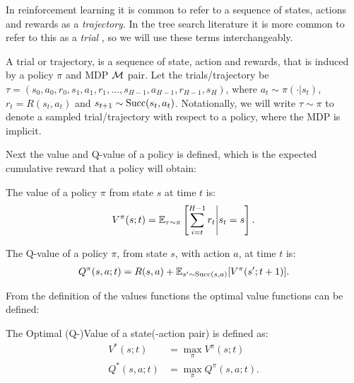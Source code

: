     In reinforcement learning it is common to refer to a sequence of states, actions and rewards as a \textit{trajectory}. In the tree search literature it is more common to refer to this as a \textit{trial} , so we will use these terms interchangeably.
    
    \begin{defn}
        \label{def:trajectory}
        \label{def:trial}
        A \textnormal{trial} or \textnormal{trajectory}, is a sequence of state, action and rewards, that is induced by a policy $\pi$ and MDP $\mathcal{M}$ pair. Let the trials/trajectory be $\tau = (s_0, a_0, r_0, s_1, a_1, r_1, ..., s_{H-1}, a_{H-1}, r_{H-1}, s_H)$, where $a_t \sim \pi(\cdot|s_t)$, $r_t=R(s_t,a_t)$ and $s_{t+1} \sim \textnormal{Succ}(s_t,a_t)$. Notationally, we will write $\tau\sim\pi$ to denote a sampled trial/trajectory with respect to a policy, where the MDP is implicit.
    \end{defn}

    Next the value and Q-value of a policy is defined, which is the expected cumulative reward that a policy will obtain:
    \begin{defn}
        \label{def:value}
        \label{def:q_value}
        The \textnormal{value} of a policy $\pi$ from state $s$ at time $t$ is:
        \begin{align}
            V^{\pi}(s;t) = \mathbb{E}_{\tau\sim\pi}\left[\sum_{i=t}^{H-1} r_t \Bigg| s_t=s \right].
        \end{align} 

        The \textnormal{Q-value} of a policy $\pi$, from state $s$, with action $a$, at time $t$ is:
        \begin{align}
            Q^{\pi}(s,a;t) = R(s,a) + \mathbb{E}_{s'\sim \textnormal{Succ}(s,a)} [V^{\pi}(s';t+1)].
        \end{align} 
    \end{defn}

    From the definition of the values functions the optimal value functions can be defined:
    \begin{defn}
        \label{def:optimal_value}
        \label{def:optimal_q_value}
        The \textnormal{Optimal (Q-)Value} of a state(-action pair) is defined as:
        \begin{align}
            V^*(s;t) &= \max_{\pi} V^{\pi}(s;t) \\
            Q^*(s,a;t) &= \max_{\pi} Q^{\pi}(s,a;t).
        \end{align}
    \end{defn}

